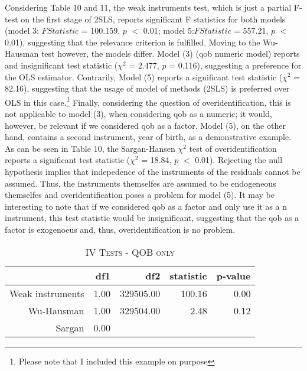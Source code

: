 \documentclass[a4paper]{article}
\begin{document}
\indent Considering Table 10 and 11, the weak instruments test, which is just a partial F-test on the first stage of 2SLS, reports significant F statistics for both models (model 3: $F Statistic$ = 100.159, $p$ $<$ 0.01; model 5:$F Statistic$ = 557.21, $p$ $<$ 0.01), suggesting that the relevance criterion is fulfilled. Moving to the Wu-Hausman test however, the models differ. Model (3) (qob numeric model) reports and insignificant test statistic (${\chi}^2$ = 2.477, $p$ = 0.116), suggesting a preference for the OLS estimator. Contrarily, Model (5) reports a significant test statistic (${\chi}^2$ = 82.16), suggesting that the usage of model of methods (2SLS) is preferred over OLS in this case.\footnote{Please note that I included this example on purpose} Finally, considering the question of overidentification, this is not applicable to model (3), when considering qob as a numeric; it would, however, be relevant if we considered qob as a factor. Model (5), on the other hand, contains a second instrument, year of birth, as a demonstrative example. As can be seen in Table 10, the Sargan-Hansen ${\chi}^2$ test of overidentification reports a significant test statistic (${\chi}^2$ = 18.84, $p$ $<$ 0.01). Rejecting the null hypothesis implies that indepedence of the instruments of the residuals cannot be assumed. Thus, the instruments themselfes are assumed to be endogeneous themselfes and overidentification poses a problem for model (5). It may be interesting to note that if we considered qob as a factor and only use it as a n instrument, this test statistic would be insignificant, suggesting that the qob as a factor is exogenoeus and, thus, overidentification is no problem. 



\begin{table}[ht]
\captionsetup{font=small, justification=centering,singlelinecheck=false}
\caption{\textsc{IV Tests - QOB only}}
\centering
\begin{tabular}{rrrrr}
  \hline
 & df1 & df2 & statistic & p-value \\ 
  \hline
Weak instruments & 1.00 & 329505.00 & 100.16 & 0.00 \\ 
  Wu-Hausman & 1.00 & 329504.00 & 2.48 & 0.12 \\ 
  Sargan & 0.00 &  &  &  \\ 
   \hline
\end{tabular}
\end{table}
\end{document}
